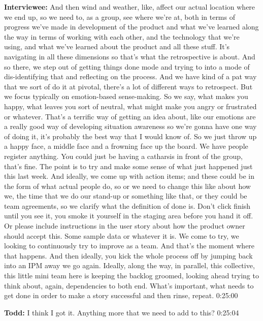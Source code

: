 \textbf{Interviewee:}  	And then wind and weather, like, affect our actual location where we end up, so we need to, as a group, see where we're at, both in terms of progress we've made in development of the product and what we've learned along the way in terms of working with each other, and the technology that we're using, and what we've learned about the product and all these stuff.  It's navigating in all these dimensions so that's what the retrospective is about.  And so there, we step out of getting things done mode and trying to into a mode of dis-identifying that and reflecting on the process.  And we have kind of a pat way that we sort of do it at pivotal, there's a lot of different ways to retrospect.  But we focus typically on emotion-based sense-making.  So we say, what makes you happy, what leaves you sort of neutral, what might make you angry or frustrated or whatever.  That's a terrific way of getting an idea about, like our emotions are a really good way of developing situation awareness so we're gonna have one way of doing it, it's probably the best way that I would know of.  So we just throw up a happy face, a middle face and a frowning face up the board. We have people register anything. You could just be having a catharsis in front of the group, that's fine.  The point is to try and make some sense of what just happened just this last week.  And ideally, we come up with action items; and these could be in the form of what actual people do, so  or we need to change this like about how we, the time that we do our stand-up or something like that, or they could be team agreements, so we clarify what the definition of done is.  Don't click finish until you see it, you smoke it yourself in the staging area before you hand it off.  Or please include instructions in the user story about how the product owner should accept this.  Some sample data or whatever it is.  We come to try, we looking to continuously try to improve as a team.  And that's the moment where that happens.  And then ideally, you kick the whole process off by jumping back into an IPM away we go again. Ideally, along the way, in parallel, this collective, this little mini team here is keeping the backlog groomed, looking ahead trying to think about, again, dependencies to both end.  What's important, what needs to get done in order to make a story successful and then rinse, repeat.  0:25:00

\textbf{Todd:}  	I think I got it.  Anything more that we need to add to this?  0:25:04

